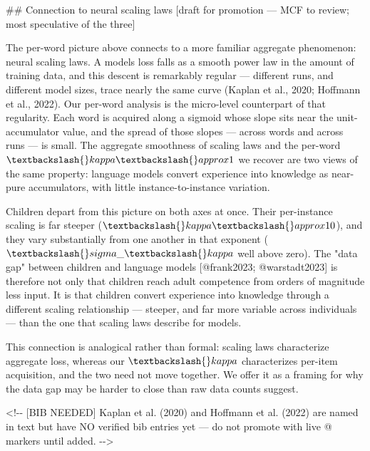 \documentclass[
  11pt,
]{article}
\newenvironment{Shaded}{\begin{snugshade}}{\end{snugshade}}
\newcommand{\CommentTok}[1]{\textcolor[rgb]{0.37,0.37,0.37}{#1}}
\newcommand{\FunctionTok}[1]{\textcolor[rgb]{0.28,0.35,0.67}{#1}}
\newcommand{\NormalTok}[1]{\textcolor[rgb]{0.00,0.23,0.31}{#1}}
\newcommand{\OtherTok}[1]{\textcolor[rgb]{0.00,0.23,0.31}{#1}}
\begin{document}
\begin{Shaded}
\begin{Highlighting}[]
\FunctionTok{\#\# Connection to neural scaling laws  [draft for promotion — MCF to review; most speculative of the three]}

\NormalTok{The per{-}word picture above connects to a more familiar aggregate}
\NormalTok{phenomenon: neural scaling laws. A model\textquotesingle{}s loss falls as a smooth power}
\NormalTok{law in the amount of training data, and this descent is remarkably}
\NormalTok{regular — different runs, and different model sizes, trace nearly the same}
\NormalTok{curve (Kaplan et al., 2020; Hoffmann et al., 2022). Our per{-}word analysis}
\NormalTok{is the micro{-}level counterpart of that regularity. Each word is acquired}
\NormalTok{along a sigmoid whose slope sits near the unit{-}accumulator value, and the}
\NormalTok{spread of those slopes — across words and across runs — is small. The}
\NormalTok{aggregate smoothness of scaling laws and the per{-}word $\textbackslash{}kappa \textbackslash{}approx 1$}
\NormalTok{we recover are two views of the same property: language models convert}
\NormalTok{experience into knowledge as near{-}pure accumulators, with little}
\NormalTok{instance{-}to{-}instance variation.}

\NormalTok{Children depart from this picture on both axes at once. Their per{-}instance}
\NormalTok{scaling is far steeper ($\textbackslash{}kappa \textbackslash{}approx 10$), and they vary substantially}
\NormalTok{from one another in that exponent ($\textbackslash{}sigma\_\textbackslash{}kappa$ well above zero). The}
\NormalTok{"data gap" between children and language models }\CommentTok{[}\OtherTok{@frank2023; @warstadt2023}\CommentTok{]}
\NormalTok{is therefore not only that children reach adult competence from orders of}
\NormalTok{magnitude less input. It is that children convert experience into knowledge}
\NormalTok{through a different scaling relationship — steeper, and far more variable}
\NormalTok{across individuals — than the one that scaling laws describe for models.}

\NormalTok{This connection is analogical rather than formal: scaling laws characterize}
\NormalTok{aggregate loss, whereas our $\textbackslash{}kappa$ characterizes per{-}item acquisition,}
\NormalTok{and the two need not move together. We offer it as a framing for why the}
\NormalTok{data gap may be harder to close than raw data counts suggest.}

\CommentTok{\textless{}!{-}{-} [BIB NEEDED] Kaplan et al. (2020) and Hoffmann et al. (2022) are named}
\CommentTok{     in text but have NO verified bib entries yet — do not promote with live}
\CommentTok{     @ markers until added. {-}{-}\textgreater{}}
\end{Highlighting}
\end{Shaded}
\end{document}
